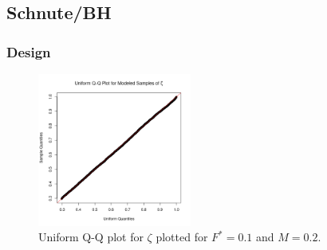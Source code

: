 %

%
\subsection{Schnute/BH}

%
\subsubsection{Design}


%
\begin{figure}
\vspace{-2cm}
\includegraphics[width=0.45\textwidth]{../gpBias/qqUnif.png}
\vspace{-1cm} %
\caption{Uniform Q-Q plot for $\zeta$ plotted for $F^*=0.1$ and $M=0.2$.}
\label{qqZeta}
\end{figure}

